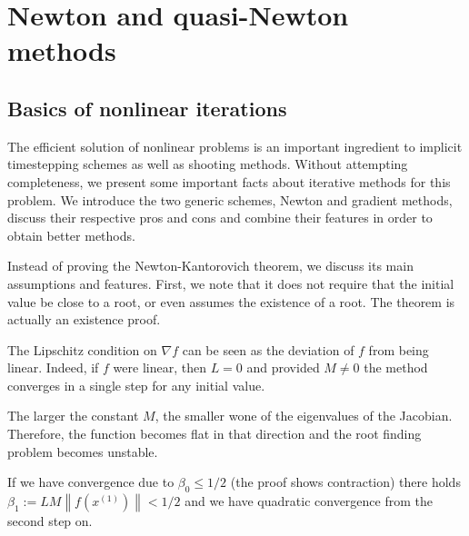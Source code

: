 \chapter{Newton and quasi-Newton methods}
\label{chapter:Newton}

\section{Basics of nonlinear iterations}
\begin{intro}
  The efficient solution of nonlinear problems is an important
  ingredient to implicit timestepping schemes as well as shooting
  methods. Without attempting completeness, we present some important
  facts about iterative methods for this problem. We introduce the two
  generic schemes, Newton and gradient methods, discuss their
  respective pros and cons and combine their features in order to
  obtain better methods.
\end{intro}






\begin{remark}
  Instead of proving the Newton-Kantorovich theorem, we discuss its
  main assumptions and features. First, we note that it does not
  require that the initial value be close to a root, or even assumes
  the existence of a root. The theorem is actually an existence proof.
  
  The Lipschitz condition on $\nabla f$ can be seen as the deviation
  of $f$ from being linear. Indeed, if $f$ were linear, then $L=0$ and
  provided $M\neq 0$ the method converges in a single step for any
  initial value.

  The larger the constant $M$, the smaller wone of the eigenvalues of %
  the Jacobian. Therefore, the function becomes flat in that
  direction and the root finding problem becomes unstable.
  
  If we have convergence due to $\beta_0 \le 1/2$ (the proof shows
  contraction) there holds $\beta_1 := LM \left\| f\left(x^{(1)}\right)
  \right\| < 1/2$ and we have quadratic convergence from the second step on.
\end{remark}





